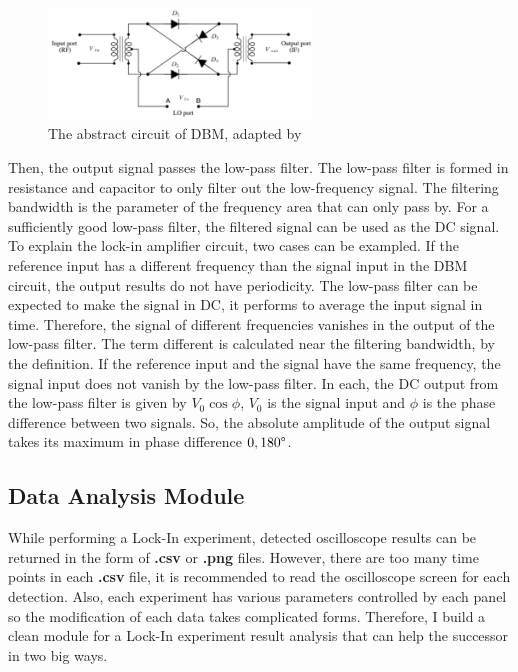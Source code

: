 \documentclass{article}
\begin{document}
 \begin{figure}[H]
  \centering
  \includegraphics[width=7cm]{../results/DBM_intro_circuit.png}
  \caption{The abstract circuit of DBM, adapted by \cite{manual}}
  \label{fig: DBM_intro}
 \end{figure}

 Then, the output signal passes the low-pass filter.
 The low-pass filter is formed in resistance and capacitor to only filter out the low-frequency signal.
 The filtering bandwidth is the parameter of the frequency area that can only pass by.
 For a sufficiently good low-pass filter, the filtered signal can be used as the DC signal.
 To explain the lock-in amplifier circuit, two cases can be exampled.
 If the reference input has a different frequency than the signal input in the DBM circuit, the output results do not have periodicity.
 The low-pass filter can be expected to make the signal in DC, it performs to average the input signal in time.
 Therefore, the signal of different frequencies vanishes in the output of the low-pass filter.
 The term different is calculated near the filtering bandwidth, by the definition.
 If the reference input and the signal have the same frequency, the signal input does not vanish by the low-pass filter.
 In each, the DC output from the low-pass filter is given by $V_0 \cos \phi$, $V_0$ is the signal input and $\phi$ is the phase difference between two signals.
 So, the absolute amplitude of the output signal takes its maximum in phase difference $0, 180 \degree$.


\subsection{Data Analysis Module}
\label{intro: python_module}
 While performing a Lock-In experiment, detected oscilloscope results can be returned in the form of \textbf{.csv} or \textbf{.png} files.
 However, there are too many time points in each \textbf{.csv} file, it is recommended to read the oscilloscope screen for each detection.
 Also, each experiment has various parameters controlled by each panel so the modification of each data takes complicated forms.
 Therefore, I build a clean module for a Lock-In experiment result analysis that can help the successor in two big ways.
\end{document}
